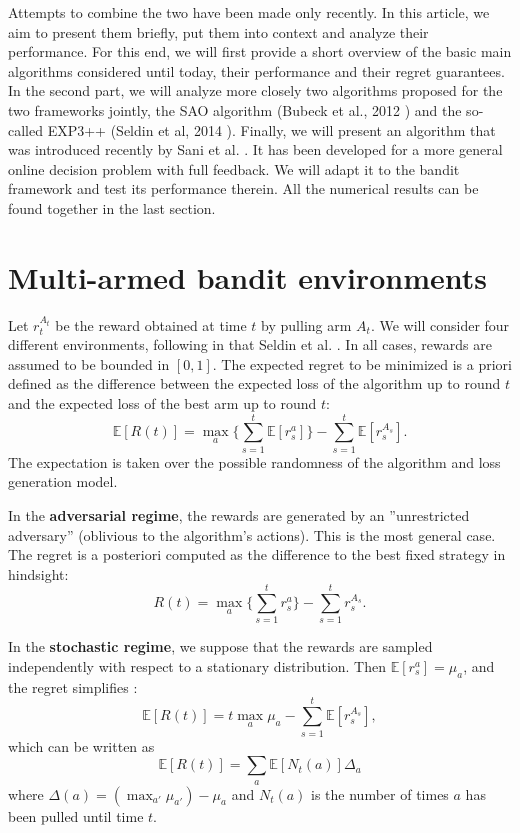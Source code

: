 \documentclass[10.5pt]{article}
\begin{document}
Attempts to combine the two have been made only recently. In this article, we aim to present them briefly, put them into context and analyze their performance. For this end, we will first provide a short overview of the basic main algorithms considered until today, their performance and their regret guarantees. In the second part, we will analyze more closely two algorithms proposed for the two frameworks jointly, the SAO algorithm (Bubeck et al., 2012 \cite{Bube12}) and the so-called EXP3++ (Seldin et al, 2014 \cite{Seld14}). Finally, we will present an algorithm that was introduced recently by Sani et al. \cite{Sani14}. It has been developed for a more general  online decision problem with full feedback. We will adapt it to the bandit framework and test its performance therein. All the numerical results can be found together in the last section.

\section*{Multi-armed bandit environments}
Let $r_{t}^{A_{t}}$ be the reward obtained at time $t$ by pulling arm $A_{t}$. We will consider four different environments, following in that Seldin et al. \cite{Seld14}. In all cases, rewards are assumed to be bounded in $[0,1]$. The expected regret to be minimized is a priori defined as the difference between the expected loss of the algorithm up to round $t$ and the expected loss of the best arm up to round $t$:
$$\mathbb{E}[R(t)]=\max_{a}\{ \sum_{s=1}^{t} \mathbb{E}[r_{s}^{a}]\}-\sum_{s=1}^{t} \mathbb{E}[r_{s}^{A_{s}}].$$
The expectation is taken over the possible randomness of the algorithm and loss generation model. 

In the \textbf{adversarial regime}, the rewards are generated by an ''unrestricted adversary'' (oblivious to the algorithm's actions). This is the most general case. The regret is a posteriori computed as the difference to the best fixed strategy in hindsight: 
$$ R(t)=\max_{a}\{ \sum_{s=1}^{t} r_{s}^{a} \}-\sum_{s=1}^{t} r_{s}^{A_{s}}.$$

In the \textbf{stochastic regime}, we suppose that the rewards are sampled independently with respect to a stationary distribution. Then $\mathbb{E}[r_{s}^{a}]=\mu_{a}$, and the regret simplifies : 
$$\mathbb{E}[R(t)]=t\max_{a}\mu_{a}-\sum_{s=1}^{t} \mathbb{E}[r_{s}^{A_{s}}],$$
which can be written as
$$\mathbb{E}[R(t)]=\sum_{a}\mathbb{E}[N_{t}(a)]\Delta_{a}$$ 
where $\Delta(a)=(\max_{a'}\mu_{a'})-\mu_{a}$ and $N_{t}(a)$ is the number of times $a$ has been pulled until time $t$.
\end{document}

